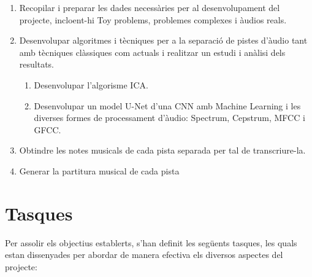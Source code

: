\documentclass[10pt,a4paper,twocolumn,twoside]{article}
\begin{document}
\begin{enumerate}
    \item Recopilar i preparar les dades necessàries per al desenvolupament del projecte, incloent-hi Toy problems, problemes complexes i àudios reals.
    
    \item Desenvolupar algoritmes i tècniques per a la separació de pistes d'àudio tant amb tècniques clàssiques com actuals i realitzar un estudi i anàlisi dels resultats.
    \begin{enumerate}
        \item Desenvolupar l'algorisme ICA.
        \item Desenvolupar un model U-Net d'una CNN amb Machine Learning i les diverses formes de processament d'àudio: Spectrum, Cepstrum, MFCC i GFCC.
    \end{enumerate}
    \item Obtindre les notes musicals de cada pista separada per tal de transcriure-la.
    \item Generar la partitura musical de cada pista
\end{enumerate}

\section{Tasques}
\label{sec:tasques}

Per assolir els objectius establerts, s'han definit les següents tasques, les quals estan dissenyades per abordar de manera efectiva els diversos aspectes del projecte:
\end{document}
